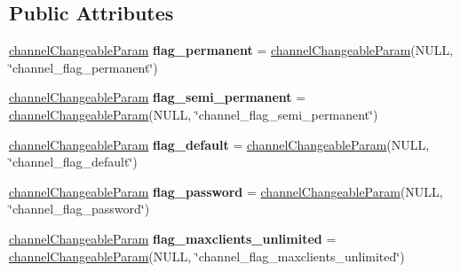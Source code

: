 \subsection*{Public Attributes}
\begin{DoxyCompactItemize}
\item 
\hyperlink{struct_ts3_api_1_1_channel_1_1channel_changeable_param}{channel\+Changeable\+Param} {\bfseries flag\+\_\+permanent} = \hyperlink{struct_ts3_api_1_1_channel_1_1channel_changeable_param}{channel\+Changeable\+Param}(N\+U\+LL, \char`\"{}channel\+\_\+flag\+\_\+permanent\char`\"{})\hypertarget{struct_ts3_api_1_1_channel_1_1channel_flags_a30f06e347962f1d6ac2d50a4bee87bd1}{}\label{struct_ts3_api_1_1_channel_1_1channel_flags_a30f06e347962f1d6ac2d50a4bee87bd1}

\item 
\hyperlink{struct_ts3_api_1_1_channel_1_1channel_changeable_param}{channel\+Changeable\+Param} {\bfseries flag\+\_\+semi\+\_\+permanent} = \hyperlink{struct_ts3_api_1_1_channel_1_1channel_changeable_param}{channel\+Changeable\+Param}(N\+U\+LL, \char`\"{}channel\+\_\+flag\+\_\+semi\+\_\+permanent\char`\"{})\hypertarget{struct_ts3_api_1_1_channel_1_1channel_flags_a6b92e7212b84b51adcd92db79e21a425}{}\label{struct_ts3_api_1_1_channel_1_1channel_flags_a6b92e7212b84b51adcd92db79e21a425}

\item 
\hyperlink{struct_ts3_api_1_1_channel_1_1channel_changeable_param}{channel\+Changeable\+Param} {\bfseries flag\+\_\+default} = \hyperlink{struct_ts3_api_1_1_channel_1_1channel_changeable_param}{channel\+Changeable\+Param}(N\+U\+LL, \char`\"{}channel\+\_\+flag\+\_\+default\char`\"{})\hypertarget{struct_ts3_api_1_1_channel_1_1channel_flags_a875dce3e91976886ee4c45574a2389a5}{}\label{struct_ts3_api_1_1_channel_1_1channel_flags_a875dce3e91976886ee4c45574a2389a5}

\item 
\hyperlink{struct_ts3_api_1_1_channel_1_1channel_changeable_param}{channel\+Changeable\+Param} {\bfseries flag\+\_\+password} = \hyperlink{struct_ts3_api_1_1_channel_1_1channel_changeable_param}{channel\+Changeable\+Param}(N\+U\+LL, \char`\"{}channel\+\_\+flag\+\_\+password\char`\"{})\hypertarget{struct_ts3_api_1_1_channel_1_1channel_flags_a5dcf754a6f091d86d62d0781c8c6b1ed}{}\label{struct_ts3_api_1_1_channel_1_1channel_flags_a5dcf754a6f091d86d62d0781c8c6b1ed}

\item 
\hyperlink{struct_ts3_api_1_1_channel_1_1channel_changeable_param}{channel\+Changeable\+Param} {\bfseries flag\+\_\+maxclients\+\_\+unlimited} = \hyperlink{struct_ts3_api_1_1_channel_1_1channel_changeable_param}{channel\+Changeable\+Param}(N\+U\+LL, \char`\"{}channel\+\_\+flag\+\_\+maxclients\+\_\+unlimited\char`\"{})\hypertarget{struct_ts3_api_1_1_channel_1_1channel_flags_ae26808390709dbf4ef3be039abe20669}{}\label{struct_ts3_api_1_1_channel_1_1channel_flags_ae26808390709dbf4ef3be039abe20669}


\end{DoxyCompactItemize}
